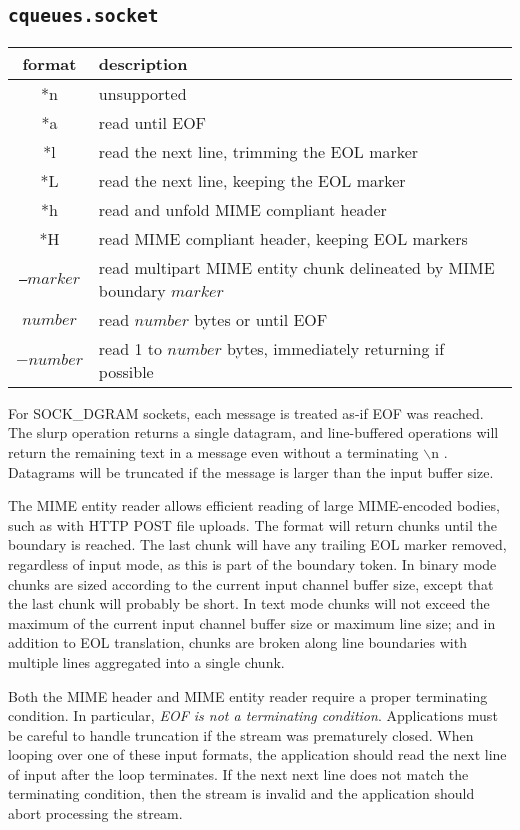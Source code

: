 \documentclass[11pt, oneside]{memoir}
\newcommand{\lf}[0]{$\backslash$n }
\newcounter{toccols}
\newenvironment{Module}[1]{
	\subsection{\texttt{#1}}
	\addtocontents{toc}{
		\protect\begin{multicols}{\value{toccols}}
	}
}{
	\addtocontents{toc}{\protect\end{multicols}}
}
\begin{document}
\begin{Module}{cqueues.socket}
\begin{tabular}{c | l}
format & description\\\hline
{*n} & unsupported \\
{*a} & read until EOF \\
{*l} & read the next line, trimming the EOL marker \\
{*L} & read the next line, keeping the EOL marker \\
{*h} & read and unfold MIME compliant header \\
{*H} & read MIME compliant header, keeping EOL markers \\
{\texttt{--}$marker$} & read multipart MIME entity chunk delineated by MIME boundary $marker$ \\
$number$ & read $number$ bytes or until EOF \\
$-number$ & read 1 to $number$ bytes, immediately returning if possible \\
\end{tabular}

For SOCK\_DGRAM sockets, each message is treated as-if EOF was reached. The slurp operation returns a single datagram, and line-buffered operations will return the remaining text in a message even without a terminating \lf. Datagrams will be truncated if the message is larger than the input buffer size.

The MIME entity reader allows efficient reading of large MIME-encoded bodies, such as with HTTP POST file uploads. The format will return chunks until the boundary is reached. The last chunk will
have any trailing EOL marker removed, regardless of input mode, as this is part of the boundary token. In binary mode chunks are sized according to the current input channel buffer size, except that the last chunk will probably be short. In text mode chunks will not exceed the maximum of the current input channel buffer size or maximum line size; and in addition to EOL translation, chunks are broken along line boundaries with multiple lines aggregated into a single chunk.

Both the MIME header and MIME entity reader require a proper terminating condition. In particular, \emph{EOF is not a terminating condition}. Applications must be careful to handle truncation if the stream was prematurely closed. When looping over one of these input formats, the application should read the next line of input after the loop terminates. If the next next line does not match the terminating condition, then the stream is invalid and the application should abort processing the stream.


\end{Module}
\end{document}
